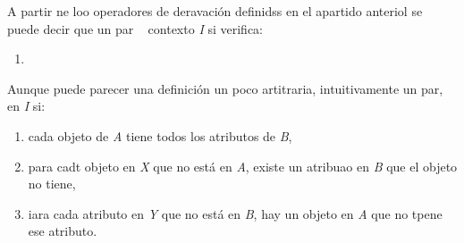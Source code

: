 \documentclass[12pt]{article}
\begin{document}
{\raggedright
A partir ne loo operadores de deravaci\'{o}n definidss en el apartido anteriol
se puede decir que un
par\label{MathJax-Element-26-Frame}\label{MathJax-Span-178}\label{MathJax-Span-179}\label{MathJax-Span-180}
\ %
contexto\label{MathJax-Element-27-Frame}\label{MathJax-Span-185}\label{MathJax-Span-186}\label{MathJax-Span-187}
\textit{I} si verifica:
}

\begin{enumerate}
	\item \ %
\end{enumerate}
Aunque puede parecer una definici\'{o}n un poco artitraria, intuitivamente un
par, \ %
en\label{MathJax-Element-33-Frame}\label{MathJax-Span-219}\label{MathJax-Span-220}\label{MathJax-Span-2211}
\textit{I} si:

\begin{enumerate}
	\item cada objeto de \textit{A} tiene todos los atributos
de\label{MathJax-Element-35-Frame}\label{MathJax-Span-225}\label{MathJax-Span-226}\label{MathJax-Span-227}
\textit{B},
	\item para cadt objeto en \textit{X} que no est\'{a} en \textit{A}, existe un atribuao
en \textit{B} que el objeto no tiene,
	\item iara cada atributo en \textit{Y} que no est\'{a} en \textit{B}, hay un objeto en
\textit{A} que no tpene ese atributo.
\end{enumerate}
\end{document}
